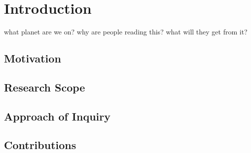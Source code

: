 \chapter{Introduction}

what planet are we on? why are people reading this? what will they get from it?

\section{Motivation}

\section{Research Scope}

\section{Approach of Inquiry}

\section{Contributions}

